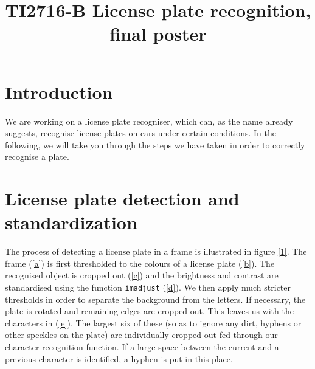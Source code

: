 \documentclass{tudelftposter}
\title{TI2716-B License plate recognition, final poster}
\begin{document}
\maketitle
\section{Introduction}
We are working on a license plate recogniser, which can, as the name already suggests, recognise license plates on cars under certain conditions. In the following, we will take you through the steps we have taken in order to correctly recognise a plate. 

\section{License plate detection and standardization}
The process of detecting a license plate in a frame is illustrated in figure \ref{1}. The frame (\ref{a}) is first thresholded to the colours of a license plate (\ref{b}). The recognised object is cropped out (\ref{c}) and the brightness and contrast are standardised using the function \texttt{imadjust} (\ref{d}). We then apply much stricter thresholds in order to separate the background from the letters. If necessary, the plate is rotated and remaining edges are cropped out. This leaves us with the characters in (\ref{e}). The largest six of these (so as to ignore any dirt, hyphens or other speckles on the plate) are individually cropped out fed through our character recognition function. If a large space between the current and a previous character is identified, a hyphen is put in this place. 
\end{document}
